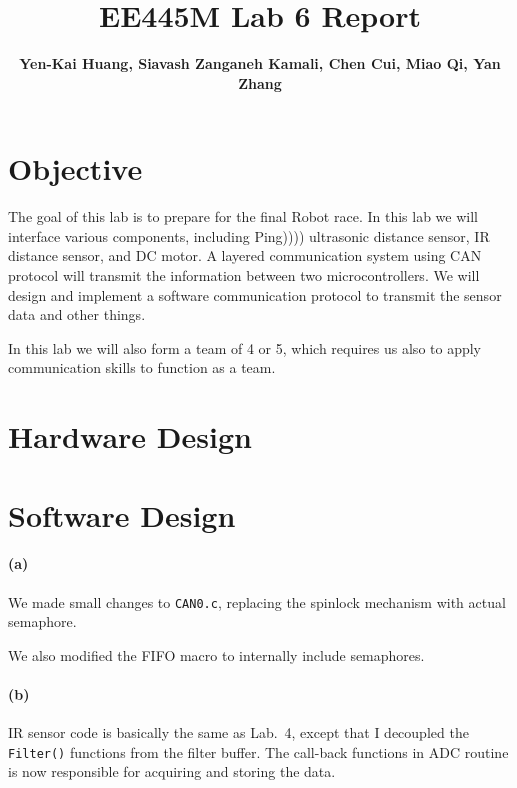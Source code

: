\documentclass[a4paper]{article}
\begin{document}
\title{EE445M Lab 6 Report}
\author{\bfseries Yen-Kai Huang, Siavash Zanganeh Kamali, Chen Cui, Miao Qi, Yan Zhang}
\maketitle

\section{Objective} The goal of this lab is to prepare for the final Robot race. In this lab we will interface various
components, including Ping)))) ultrasonic distance sensor, IR distance sensor, and DC motor. A layered communication system
using CAN protocol will transmit the information between two microcontrollers. We will design and implement a software
communication protocol to transmit the sensor data and other things.

In this lab we will also form a team of 4 or 5, which requires us also to apply communication skills to function as a team.

\section{Hardware Design}

\section{Software Design} 

\paragraph{(a)} We made small changes to \texttt{CAN0.c}, replacing the spinlock  mechanism with actual semaphore.

\lstset{language=C, style=MyCStyle}


We also modified the FIFO macro to internally include semaphores.



\paragraph{(b)} IR sensor code is basically the same as Lab.\ 4, except that I decoupled the \texttt{Filter()} functions
from the filter buffer. The call-back functions in ADC routine is now responsible for acquiring and storing the data.
\end{document}
